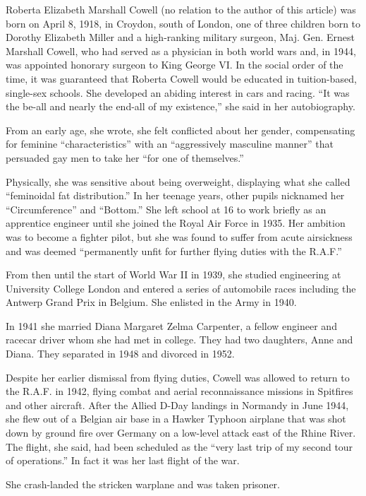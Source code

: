 Roberta Elizabeth Marshall Cowell (no relation to the author of this
article) was born on April 8, 1918, in Croydon, south of London, one of
three children born to Dorothy Elizabeth Miller and a high-ranking
military surgeon, Maj. Gen. Ernest Marshall Cowell, who had served as a
physician in both world wars and, in 1944, was appointed honorary
surgeon to King George VI. In the social order of the time, it was
guaranteed that Roberta Cowell would be educated in tuition-based,
single-sex schools. She developed an abiding interest in cars and
racing. ``It was the be-all and nearly the end-all of my existence,''
she said in her autobiography.

From an early age, she wrote, she felt conflicted about her gender,
compensating for feminine ``characteristics'' with an ``aggressively
masculine manner'' that persuaded gay men to take her ``for one of
themselves.''

Physically, she was sensitive about being overweight, displaying what
she called ``feminoidal fat distribution.'' In her teenage years, other
pupils nicknamed her ``Circumference'' and ``Bottom.'' She left school
at 16 to work briefly as an apprentice engineer until she joined the
Royal Air Force in 1935. Her ambition was to become a fighter pilot, but
she was found to suffer from acute airsickness and was deemed
``permanently unfit for further flying duties with the R.A.F.''

From then until the start of World War II in 1939, she studied
engineering at University College London and entered a series of
automobile races including the Antwerp Grand Prix in Belgium. She
enlisted in the Army in 1940.

In 1941 she married Diana Margaret Zelma Carpenter, a fellow engineer
and racecar driver whom she had met in college. They had two daughters,
Anne and Diana. They separated in 1948 and divorced in 1952.

Despite her earlier dismissal from flying duties, Cowell was allowed to
return to the R.A.F. in 1942, flying combat and aerial reconnaissance
missions in Spitfires and other aircraft. After the Allied D-Day
landings in Normandy in June 1944, she flew out of a Belgian air base in
a Hawker Typhoon airplane that was shot down by ground fire over Germany
on a low-level attack east of the Rhine River. The flight, she said, had
been scheduled as the ``very last trip of my second tour of
operations.'' In fact it was her last flight of the war.

She crash-landed the stricken warplane and was taken prisoner.

